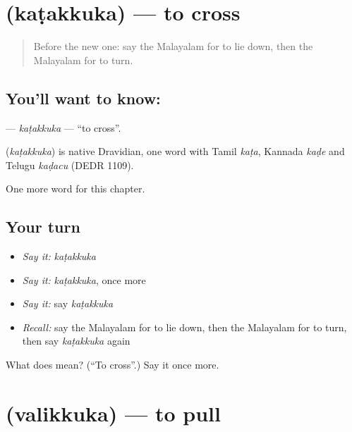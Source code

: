 \section[\texorpdfstring{\ml{കടക്കുക} (kaṭakkuka)}{കടക്കുക (kaṭakkuka)}]{ (kaṭakkuka) — to cross}

\label{lesson:ML-C181-katakkuka}



\begin{quote}
Before the new one: say the Malayalam for to lie down, then the Malayalam for to turn.
\end{quote}

\subsection*{You'll want to know: }
\textbf{} — \emph{kaṭakkuka} — \textquotedblleft{}to cross\textquotedblright{}.

\begin{cousinweb}
\textbf{} (\emph{kaṭakkuka}) is native Dravidian, one word with Tamil \emph{kaṭa}, Kannada \emph{kaḍe} and Telugu \emph{kaḍacu} (DEDR 1109).
\end{cousinweb}

\begin{grammarlens}[title={What you've built}]
One more word for this chapter.
\end{grammarlens}

\subsection*{Your turn}
\begin{itemize}
\raggedright
  \item \emph{Say it:} \emph{kaṭakkuka}
  \item \emph{Say it:} \emph{kaṭakkuka}, once more
  \item \emph{Say it:} say \emph{kaṭakkuka}
  \item \emph{Recall:} say the Malayalam for to lie down, then the Malayalam for to turn, then say \emph{kaṭakkuka} again
\end{itemize}

\begin{tcolorbox}[breakable,colback=teal!4,colframe=teal!35!black,title={Before you move on}]
What does  mean? (\textquotedblleft{}To cross\textquotedblright{}.) Say it once more.
\end{tcolorbox}
\section[\texorpdfstring{\ml{വലിക്കുക} (valikkuka)}{വലിക്കുക (valikkuka)}]{ (valikkuka) — to pull}

